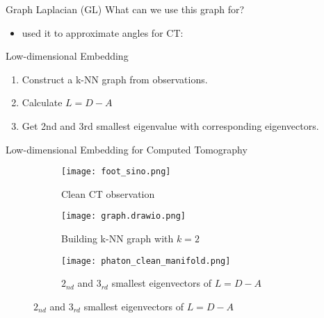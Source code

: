 \begin{frame}{Graph Laplacian (GL)}
  \alert<1>{What can we use this graph for?}
  \pause
  \begin{itemize}
  \item \cite{LaplaceRandomProjections} used it to approximate angles for CT:
\end{itemize}

\pause

\begin{block}{Low-dimensional Embedding}
  \begin{enumerate}
    \item Construct a k-NN graph from observations.
    \item Calculate $L = D - A $
    \item Get 2nd and 3rd smallest eigenvalue with corresponding eigenvectors.
  \end{enumerate}
\end{block}

\end{frame}


\begin{frame}{Low-dimensional Embedding for Computed Tomography}
  \begin{figure}
    \centering
    \begin{subfigure}[t]{0.25\textwidth}
        \texttt{[image: foot\_sino.png]}
        \caption{Clean CT observation}
    \end{subfigure} \hfill
    \pause
    \begin{subfigure}[t]{0.3\textwidth}
        \texttt{[image: graph.drawio.png]}
        \caption{Building k-NN graph with $ k = 2$ }
    \end{subfigure}\hfill
    \pause
    \begin{subfigure}[t]{0.3\textwidth}
      \texttt{[image: phaton\_clean\_manifold.png]}
      \caption{$2_{nd}$ and $3_{rd}$ smallest eigenvectors of  $L =  D - A$}
  \end{subfigure}
\end{figure}
  
\end{frame}


